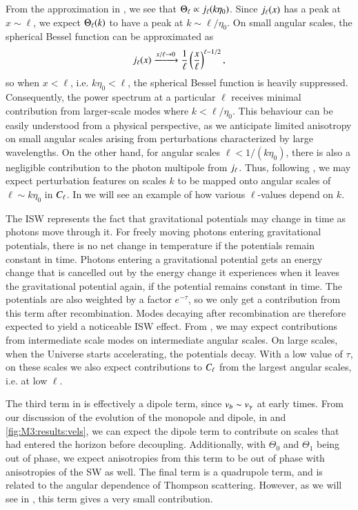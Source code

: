 From the approximation in , we see that $\Theta_\ell\propto j_\ell(k\eta_0)$. Since $j_\ell(x)$ has a peak at $x\sim\ell$, we expect $\Theta_\ell(k)$ to have a peak at $k\sim\ell/\eta_0$. On small angular scales, the spherical Bessel function can be approximated as \cite[Eq. (9.61)]{Dodelson}
\begin{equation}
    j_\ell(x) \xrightarrow{x/\ell\to0} \frac{1}{\ell}\left( \frac{x}{\ell} \right)^{\ell-1/2},
\end{equation} 
so when $x<\ell$, i.e. $k\eta_0<\ell$, the spherical Bessel function is heavily suppressed. Consequently, the power spectrum at a particular $\ell$ receives minimal contribution from larger-scale modes where $k<\ell/\eta_0$. This behaviour can be easily understood from a physical perspective, as we anticipate limited anisotropy on small angular scales arising from perturbations characterized by large wavelengths. On the other hand, for angular scales $\ell<1/(k\eta_0)$, there is also a negligible contribution to the photon multipole from $j_\ell$. Thus, following , we may expect perturbation features on scales $k$ to be mapped onto angular scales of $\ell\sim k\eta_0$ in $C_\ell$. In  we will see an example of how various $\ell$-values depend on $k$.   

The ISW represents the fact that gravitational potentials may change in time as photons move through it. For freely moving photons entering gravitational potentials, there is no net change in temperature if the potentials remain constant in time. Photons entering a gravitational potential gets an energy change that is cancelled out by the energy change it experiences when it leaves the gravitational potential again, if the potential remains constant in time. The potentials are also weighted by a factor $e^{-\tau}$, so we only get a contribution from this term after recombination. Modes decaying after recombination are therefore expected to yield a noticeable ISW effect. From , we may expect contributions from intermediate scale modes on intermediate angular scales. On large scales, when the Universe starts accelerating, the potentials decay. With a low value of $\tau$, on these scales we also expect contributions to $C_\ell$ from the largest angular scales, i.e. at low $\ell$.  

The third term in  is effectively a dipole term, since $v_b\sim v_\gamma$ at early times. From our discussion of the evolution of the monopole and dipole, in  and \ref{fig:M3:results:vels}, we can expect the dipole term to contribute on scales that had entered the horizon before decoupling. Additionally, with $\Theta_0$ and $\Theta_1$ being out of phase, we expect anisotropies from this term to be out of phase with anisotropies of the SW as well. The final term is a quadrupole term, and is related to the angular dependence of Thompson scattering. However, as we will see in , this term gives a very small contribution.

